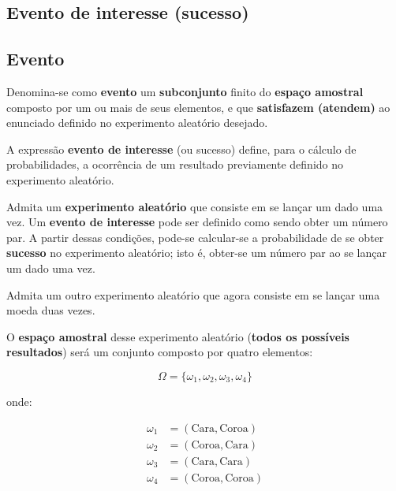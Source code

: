 \documentclass[
]{book}
\begin{document}
\hfill\break

\hypertarget{evento-de-interesse-sucesso}{%
\subsection{Evento de interesse (sucesso)}\label{evento-de-interesse-sucesso}}

\hypertarget{evento}{%
\subsection{Evento}\label{evento}}

Denomina-se como \textbf{evento} um \textbf{subconjunto} finito do \textbf{espaço amostral} composto por um ou mais de seus elementos, e que \textbf{satisfazem (atendem)} ao enunciado definido no experimento aleatório desejado.

\hfill\break

A expressão \textbf{evento de interesse} (ou sucesso) define, para o cálculo de probabilidades, a ocorrência de um resultado previamente definido no experimento aleatório.

\hfill\break

Admita um \textbf{experimento aleatório} que consiste em se lançar um dado uma vez. Um \textbf{evento de interesse} pode ser definido como sendo obter um número par. A partir dessas condições, pode-se calcular-se a probabilidade de se obter \textbf{sucesso} no experimento aleatório; isto é, obter-se um número par ao se lançar um dado uma vez.

\hfill\break

Admita um outro experimento aleatório que agora consiste em se lançar uma moeda duas vezes.

\hfill\break

O \textbf{espaço amostral} desse experimento aleatório (\textbf{todos os possíveis resultados}) será um conjunto composto por quatro elementos:

\hfill\break

\[
\Omega = \{\omega_{1}, \omega_{2}, \omega_{3}, \omega_{4}\}
\]

\hfill\break

onde:

\hfill\break

\begin{align*}
\omega_{1} & = (\text{Cara}, \text{Coroa})\\
\omega_{2} & = (\text{Coroa}, \text{Cara})\\
\omega_{3} & = (\text{Cara}, \text{Cara}) \\
\omega_{4} & = (\text{Coroa}, \text{Coroa})
\end{align*}
\end{document}
